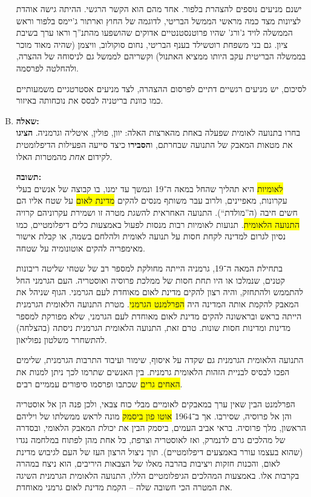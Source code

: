 \documentclass[a4paper]{article}
\newcommand\hl[1]   {\colorbox{yellow}{\!\!#1\!\!}}
\begin{document}
\begin{enumerate}[A.]
			ישנם מניעים נוספים להצהרת בלפור. אחד מהם הוא הקשר הרגשי. ההיתה גישה אוהדת לציונות מצד כמה מראשי הממשל הבריטי, לדוגמה של החוץ וארתור ג'יימס בלפור וראש הממשלה לויד ג'ורג' שהיו פרוטנסטנטיים אדוקים שהושפעו מהתנ''ך וראו ערך בשיבת ציון. גם בני משפחת רוטשילד בענף הבריטי, נחום סוקולוב, וויצמן (שהיה מאוד מוכר בממשלה הבריטית עקב היותו ממציא האתנול) וקשריהם לממשל גם לניסוחה של ההצרה, ולהחלטה לפרסמה. 
			
			לסיכום, יש מניעים רגשיים דתיים לפרסום ההצהרה, לצד מניעים אסטרטגיים משמעותיים כמו כוונת בריטניה לבסס את נוכחותה באיזור. 
			
			
			\item \textbf{שאלה: }\\
			בחרו בתנועה לאומית שפעלה באחת מהארצות האלה: יוון, פולין, איטליה וגרמניה. \textbf{הציגו} את מטאות המאבק של התנועה שבחרתם, ו\textbf{הסבירו} כיצד סייעה הפעילות הדיפלומטית לקידום \textit{אחת} מהמטרות האלו. 
			
			\textbf{תשובה: }\\
			\hl{לאומיות} היא תהליך שהחל במאה ה־19 ונמשך עד ימנו, בו קבוצה של אנשים בעלי עקרונות, מאפיינים, ולרוב עבר משותף מנסים להקים \hl{מדינת לאום} על שטח אליו הם חשים חיבה (ה''מולדת``). התנועה האחראית להשגת מטרה זו ושמירת עקרוניהם קרויה \hl{התנועה הלאומית}. תנועות לאומיות רבות מנסות לפעול באמצעות כלים דיפלומטיים, כמו נסיון לגרום למדינה לקחת חסות על תנועה לאומית ולהלחם בשמה, או קבלת אישור מאימפריה להקים אוטונומיה על שטחה. 
			
			בתחילת המאה ה־19, גרמניה הייתה מחולקת למספר רב של שטחי שליטה ריבונות קטנים, שנמלכו או היו תחת חסות של ממלכת פרוסיה ואוסטריה. העם הגרמני החל להתממש ולהתחזק, והיה רצון להקים מדינת לאום מאוחדת לעם הגרמני. הגוף שניהל את המאבק להקמת אותה המדינה היה \hl{הפרלמנט הגרמני}. מטרת התנועה הלאומית הגרמנית הייתה בראש ובראשונה להקים מדינת לאום מאוחדת לעם הגרמני, שלא מפורקת למספר מדינות ומדינות חסות שונות. טרם זאת, התנועה הלאומית הגרמנית ניסתה (בהצלחה) להתשחרר משלטון נפוליאון. 
			
			התנועה הלאומית הגרמנית גם שקדה על איסוף, שימור ועיבוד התרבות הגרמנית, שלימים הפכו לבסיס לבניית הזהות הלאומית גרמנית. בין האנשים שתרמו לכך ניתן למנות את \hl{האחים גרים} שכתבו ופרסמו סיפורים עממיים רבים. 
			
			הפרלמנט הבין שאין ערך במאבקים לאומיים מבלי כוח צבאי, ולכן פנה הן אל אוסטריה והן אל פרוסיה, שסירבו. אך ב־1964 \hl{אוטו פון ביסמק} מונה לראש ממשלתו של ויליהם הראשון, מלך פרוסיה. בראי אביב העמים, ביסמק הבין את יכולת המאבק הלאומי, ובסדרה של מהלכים גרם לדנמרק, ואז לאוסטריה וצרפת, כל אחת מהן לפתוח במלחמה נגדו (שהוא בעצמו עורר באמצעים דיפלומטיים). תוך ניצול הרצון העז של העם לגיבוש מדינת לאום, והכנות חזקות ויציבות בהרבה מאלו של הצבאות היריבים, הוא ניצח במהרה בקרבות אלו. באמצעות המהלכים הגיפלומטיים הללו, התנועה הלאומית הגרמנית השיגה את המטרה הכי חשובה שלה – הקמת מדינת לאום גרמני מאוחדת. 
			
		\end{enumerate}
\end{document}
